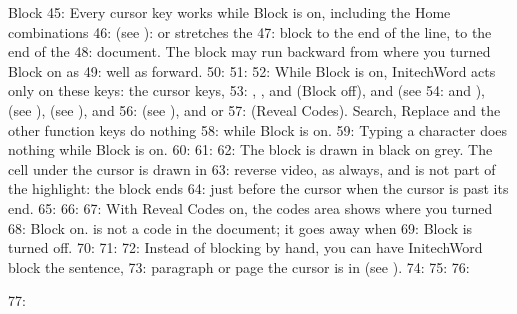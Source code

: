 \begin{Feature}{Block}
45: Every cursor key works while Block is on, including the Home combinations
46: (see ):  or  stretches the
47: block to the end of the line,  to the end of the
48: document.  The block may run backward from where you turned Block on as
49: well as forward.
50: 
51: 
52: While Block is on, InitechWord acts only on these keys: the cursor keys,
53: , ,  and  (Block off),  and  (see
54:  and ),  (see ),  (see ),  and
56:  (see ), and  or 
57: (Reveal Codes).  Search, Replace and the other function keys do nothing
58: while Block is on.
59: Typing a character does nothing while Block is on.
60: 
61: 
62: The block is drawn in black on grey.  The cell under the cursor is drawn in
63: reverse video, as always, and is not part of the highlight: the block ends
64: just before the cursor when the cursor is past its end.
65: 
66: 
67: With Reveal Codes on, the codes area shows \Code{[Block]} where you turned
68: Block on.  \Code{[Block]} is not a code in the document; it goes away when
69: Block is turned off.
70: 
71: 
72: Instead of blocking by hand, you can have InitechWord block the sentence,
73: paragraph or page the cursor is in (see ).
74: 
75: 
76: \end{Feature}
77: 
